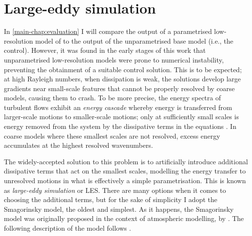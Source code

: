 \documentclass[../main.tex]{subfiles}
\begin{document}
\section{Large-eddy simulation}
In \cref{main-chap:evaluation} I will compare the output of a parametrised
low-resolution model of  to the
output of the unparametrised base model (i.e., the control). However, it was
found in the early stages of this work that unparametrised low-resolution
models were prone to numerical instability, preventing the obtainment of a
suitable control solution. This is to be expected; at high Rayleigh numbers,
when dissipation is weak, the solutions develop large gradients near
small-scale features that cannot be properly resolved by coarse models, causing
them to crash. To be more precise, the energy spectra of turbulent flows
exhibit an \emph{energy cascade} whereby energy is transferred from
larger-scale motions to smaller-scale motions; only at sufficiently small
scales is energy removed from the system by the dissipative terms in the
equations \parencite{pope2000}. In coarse models where these smallest scales
are not resolved, excess energy accumulates at the highest resolved
wavenumbers.

The widely-accepted solution to this problem is to artificially introduce
additional dissipative terms that act on the smallest scales, modelling the
energy transfer to unresolved motions in what is effectively a simple
parametrisation. This is known as \emph{large-eddy simulation} or LES. There
are many options when it comes to choosing the additional terms, but for the
sake of simplicity I adopt the Smagorinsky model, the oldest and simplest. As
it happens, the Smagorinsky model was originally proposed in the context of
atmospheric modelling, by \textcite{smagorinsky1963}. The following description
of the model follows \textcite{pope2000}.
\end{document}
